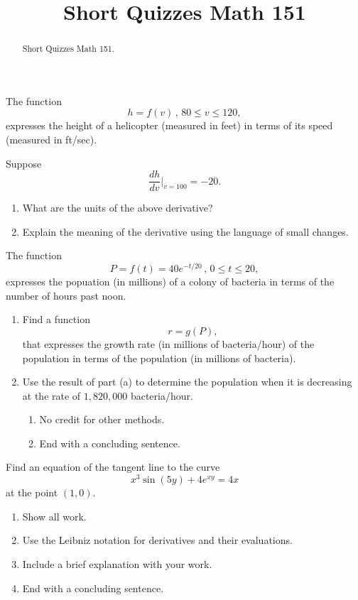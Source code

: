\documentclass{ximera}
\title{Short Quizzes Math 151}
\begin{document}
\begin{abstract}
Short Quizzes Math 151.
\end{abstract}
\maketitle

\begin{question}  \label{Qddsfsggtgttrghhgfgd}
The function
\[
      h = f(v) \, , \, 80 \leq v \leq 120 ,
\]
expresses the height of a helicopter (measured in feet) in terms of its speed (measured in ft/sec).

Suppose
\[
   \frac{dh}{dv}\Big|_{v=100} = - 20 .
\] 

\begin{enumerate}
\item What are the units of the above derivative?

\item Explain the meaning of the derivative using the language of small changes.
\end{enumerate}

\end{question}

\begin{question} \label{Qbgythjhjhgg}
The function
\[
     P = f(t) = 40e^{-t/20}\, , \, 0\leq t \leq 20 ,
\]
expresses the popuation (in millions) of a colony of bacteria in terms of the number of hours past noon.

\begin{enumerate}
\item Find a function
\[
     r  = g(P),
\]
that expresses the growth rate (in millions of bacteria/hour) of the population in terms of the population (in millions of bacteria).

\item Use the result of part (a) to determine the population when it is decreasing at the rate of $1,820,000$ bacteria/hour.

\begin{enumerate}
\item No credit for other methods.
\item End with a concluding sentence.
\end{enumerate}

\end{enumerate}
\end{question}

\begin{question}  \label{Qgghghnbnvxbvvb}
Find an equation of the tangent line to the curve
\[
   x^3\sin(5y) + 4e^{xy} = 4x
\]
at the point $(1,0)$.

\begin{enumerate}
\item Show all work.

\item Use the Leibniz notation for derivatives and their evaluations.

\item Include a brief explanation with your work.

\item End with a concluding sentence.
\end{enumerate}
\end{question} 
\end{document}
